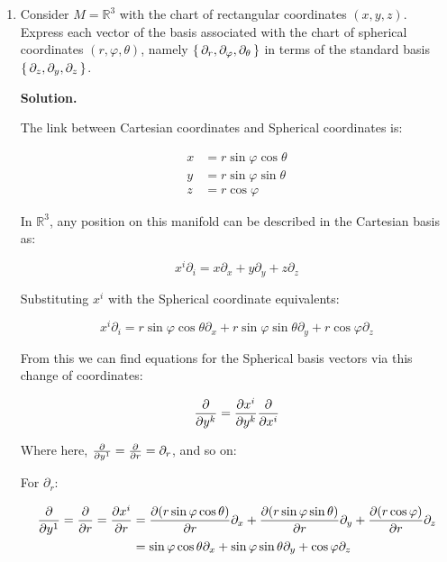 \documentclass[10pt]{article}
\begin{document}
\begin{enumerate}[start=1,label={\bfseries Exercise \arabic*:},leftmargin=1in]
        



    \bigskip
    \item Consider \(M = \mathbb{R}^3\) with the chart of rectangular coordinates \((x,y,z)\). Express each vector of the basis associated with the chart of spherical coordinates \((r, \varphi, \theta)\), namely \(\set{\partial_r, \partial_{\varphi}, \partial_{\theta}}\) in terms of the standard basis \(\set{\partial_z, \partial_y, \partial_z}\).

        \textbf{Solution.}

        The link between Cartesian coordinates and Spherical coordinates is:

        \begin{align*}
            x &= r \sin{\varphi} \cos{\theta} \\
            y &= r \sin{\varphi} \sin{\theta} \\
            z &= r \cos{\varphi}
        \end{align*} 

        In \(\mathbb{R}^3\), any position on this manifold can be described in the Cartesian basis as: 

        \begin{equation*}
            x^i \partial_i = x \partial_x + y \partial_y + z \partial_z
        \end{equation*}

        Substituting \(x^i\) with the Spherical coordinate equivalents:

        \begin{equation*}
            x^i \partial_i = r \sin{\varphi} \cos{\theta} \partial_x + r \sin{\varphi} \sin{\theta} \partial_y + r \cos{\varphi} \partial_z  
        \end{equation*}

        From this we can find equations for the Spherical basis vectors via this change of coordinates:

        \begin{equation*}
            \pdv{y^k} = \pdv{x^i}{y^k} \pdv{x^i} 
        \end{equation*}

        Where here, \( \pdv{y^1} = \pdv{r} = \partial_r\), and so on:

        For \(\partial_r\):

        \begin{align*}
            \pdv{y^1} = \pdv{r} = \pdv{x^i}{r} &= \pdv{(r \sin{\varphi} \cos{\theta})}{r} \partial_x + \pdv{(r \sin{\varphi} \sin{\theta})}{r} \partial_y + \pdv{(r \cos{\varphi})}{r} \partial_z \\
                                               &= \sin{\varphi} \cos{\theta} \partial_x + \sin{\varphi} \sin{\theta} \partial_y + \cos{\varphi} \partial_z
        \end{align*}
        

\end{enumerate}
\end{document}
